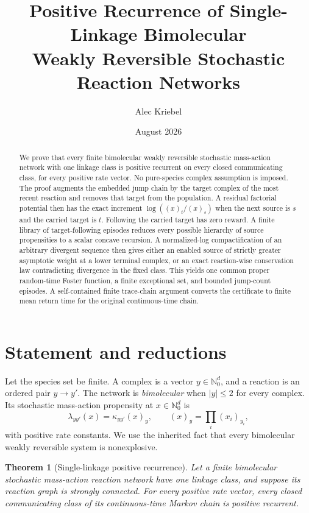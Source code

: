 \documentclass[11pt]{article}
\title{Positive Recurrence of Single-Linkage Bimolecular\\
Weakly Reversible Stochastic Reaction Networks}
\author{Alec Kriebel}
\date{August 2026}
\newtheorem{theorem}{Theorem}[section]
\theoremstyle{definition}
\newcommand{\N}{\mathbb N_0}
\newcommand{\ff}[2]{(#1)_{#2}}
\begin{document}
\maketitle

\begin{abstract}
We prove that every finite bimolecular weakly reversible stochastic
mass-action network with one linkage class is positive recurrent on every
closed communicating class, for every positive rate vector.  No pure-species
complex assumption is imposed.  The proof augments the embedded jump chain by
the target complex of the most recent reaction and removes that target from
the population.  A residual factorial potential then has the exact increment
\(
\log(\ff{x}{t}/\ff{x}{s})
\)
when the next source is \(s\) and the carried target is \(t\).  Following the
carried target has zero reward.  A finite library of target-following episodes
reduces every possible hierarchy of source propensities to a scalar concave
recursion.  A normalized-log compactification of an arbitrary divergent
sequence then gives either an enabled source of strictly greater asymptotic
weight at a lower terminal complex, or an exact reaction-wise conservation
law contradicting divergence in the fixed class.  This yields one common
proper random-time Foster function, a finite exceptional set, and bounded
jump-count episodes.  A self-contained finite trace-chain argument converts
the certificate to finite mean return time for the original continuous-time
chain.
\end{abstract}

\tableofcontents

\section{Statement and reductions}

Let the species set be finite.  A complex is a vector \(y\in\N^d\), and a
reaction is an ordered pair \(y\to y'\).  The network is \emph{bimolecular}
when \(|y|\leq 2\) for every complex.  Its stochastic mass-action propensity
at \(x\in\N^d\) is
\[
  \lambda_{y y'}(x)=\kappa_{y y'}\ff{x}{y},
  \qquad
  \ff{x}{y}=\prod_i (x_i)_{y_i},
\]
with positive rate constants.  We use the inherited fact that every
bimolecular weakly reversible system is nonexplosive.

\begin{theorem}[Single-linkage positive recurrence]\label{thm:main}
Let a finite bimolecular stochastic mass-action reaction network have one
linkage class, and suppose its reaction graph is strongly connected.  For
every positive rate vector, every closed communicating class of its
continuous-time Markov chain is positive recurrent.
\end{theorem}
\end{document}

